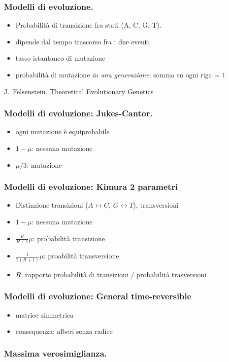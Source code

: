 \begin{frame}[fragile]
  \frametitle{Modelli di evoluzione.}
\begin{itemize}
\item
  Probabilità di transizione fra stati (A, C, G, T).
\item
  dipende dal tempo trascorso fra i due eventi
\item
  tasso istantaneo di mutazione
\item
  probabilità di mutazione \emph{in una generazione}: somma su ogni riga = $1$
\end{itemize}

J.~Felsenstein.
%
 Theoretical Evolutionary Genetics
\end{frame}

\begin{frame}[fragile]
  \frametitle{Modelli di evoluzione: Jukes-Cantor.}
\begin{itemize}
\item
  ogni mutazione è equiprobabile
\item
  $1-\mu$: nessuna mutazione
\item
  $\mu/3$: mutazione
\end{itemize}
\end{frame}

\begin{frame}[fragile]
  \frametitle{Modelli di evoluzione: Kimura 2 parametri}
\begin{itemize}
\item
  Distinzione transizioni ($A\leftrightarrow C$, $G\leftrightarrow T$), transversioni
\item
  $1-\mu$: nessuna mutazione
\item
  $\frac{R}{R+1}\mu$: probabilità transizione
\item
  $\frac{1}{2(R+1)}\mu$: proabilità transversione
\item
  $R$: rapporto probabilità di transizioni / probabilità trasversioni
\end{itemize}
\end{frame}

\begin{frame}[fragile]
  \frametitle{Modelli di evoluzione: General time-reversible}
\begin{itemize}
\item
  matrice simmetrica
\item
  consequenza: alberi senza radice
\end{itemize}
\end{frame}


\begin{frame}[fragile]
\frametitle{Massima verosimiglianza.}
\end{frame}




